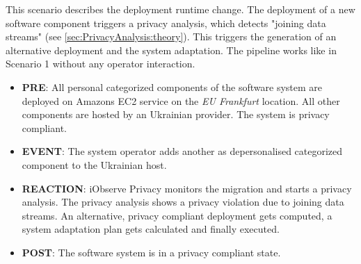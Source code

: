 This scenario describes the deployment runtime change. The deployment of a new software component triggers a privacy analysis, which detects "joining data streams" (see \autoref{sec:PrivacyAnalysis:theory}). This triggers the generation of an alternative deployment and the system adaptation. The pipeline works like in Scenario 1 without any operator interaction.
\begin{itemize}
	\setlength\itemsep{0em}
	\item \textbf{PRE}: All personal categorized components of the software system are deployed on Amazons EC2 service on the \textit{EU Frankfurt} location. All other components are hosted by an Ukrainian provider. The system is privacy compliant.
	\item \textbf{EVENT}: The system operator adds another as depersonalised categorized component to the Ukrainian host.
	\item \textbf{REACTION}: iObserve Privacy monitors the migration and starts a privacy analysis. The privacy analysis shows a privacy violation due to joining data streams. An alternative, privacy compliant deployment gets computed, a system adaptation plan gets calculated and finally executed.
	\item \textbf{POST}: The software system is in a privacy compliant state.
\end{itemize}

